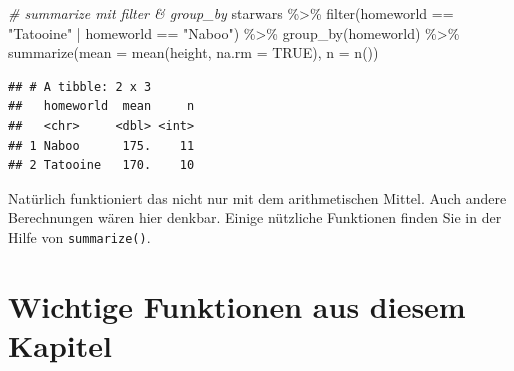 \documentclass[
]{book}
\newenvironment{Shaded}{\begin{snugshade}}{\end{snugshade}}
\newcommand{\AttributeTok}[1]{\textcolor[rgb]{0.77,0.63,0.00}{#1}}
\newcommand{\CommentTok}[1]{\textcolor[rgb]{0.56,0.35,0.01}{\textit{#1}}}
\newcommand{\ConstantTok}[1]{\textcolor[rgb]{0.00,0.00,0.00}{#1}}
\newcommand{\FunctionTok}[1]{\textcolor[rgb]{0.00,0.00,0.00}{#1}}
\newcommand{\NormalTok}[1]{#1}
\newcommand{\SpecialCharTok}[1]{\textcolor[rgb]{0.00,0.00,0.00}{#1}}
\newcommand{\StringTok}[1]{\textcolor[rgb]{0.31,0.60,0.02}{#1}}
\begin{document}
\begin{Shaded}
\begin{Highlighting}[]
\CommentTok{\# summarize mit filter \& group\_by}
\NormalTok{starwars }\SpecialCharTok{\%\textgreater{}\%}
  \FunctionTok{filter}\NormalTok{(homeworld }\SpecialCharTok{==} \StringTok{"Tatooine"} \SpecialCharTok{|}\NormalTok{ homeworld }\SpecialCharTok{==} \StringTok{"Naboo"}\NormalTok{) }\SpecialCharTok{\%\textgreater{}\%} 
  \FunctionTok{group\_by}\NormalTok{(homeworld) }\SpecialCharTok{\%\textgreater{}\%} 
  \FunctionTok{summarize}\NormalTok{(}\AttributeTok{mean =} \FunctionTok{mean}\NormalTok{(height, }\AttributeTok{na.rm =} \ConstantTok{TRUE}\NormalTok{), }\AttributeTok{n =} \FunctionTok{n}\NormalTok{())}
\end{Highlighting}
\end{Shaded}

\begin{verbatim}
## # A tibble: 2 x 3
##   homeworld  mean     n
##   <chr>     <dbl> <int>
## 1 Naboo      175.    11
## 2 Tatooine   170.    10
\end{verbatim}

Natürlich funktioniert das nicht nur mit dem arithmetischen Mittel. Auch andere Berechnungen wären hier denkbar. Einige nützliche Funktionen finden Sie in der Hilfe von \texttt{summarize()}.

\hypertarget{wichtige-funktionen-aus-diesem-kapitel-1}{%
\section*{Wichtige Funktionen aus diesem Kapitel}\label{wichtige-funktionen-aus-diesem-kapitel-1}}
\end{document}
